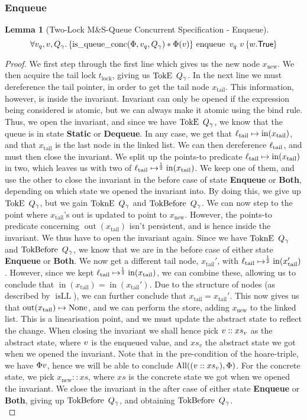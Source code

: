 \documentclass[a4paper, 10pt]{report}
\theoremstyle{definition}
\newtheorem{lemma}[theorem]{Lemma}
\newcommand{\enqueue}{\operatorname{enqueue}}
\newcommand{\msq}{M\&S-Queue\xspace}
\newcommand{\tlmsq}{Two-Lock \msq}
\newcommand{\isqueueconc}{\operatorname{is\_queue\_conc}}
\newcommand{\vq}{v_q}
\newcommand{\xsc}{xs}
\newcommand{\isLL}{\operatorname{isLL}}
\newcommand{\AllP}{\operatorname{All}}
\newcommand{\locN}[1]{\loc_{\mathrm{#1}}}
\newcommand{\loctail}{\locN{tail}}
\newcommand{\nIn}[1]{\operatorname{in}(#1)}
\newcommand{\nOut}[1]{\operatorname{out}(#1)}
\newcommand{\node}{x}
\newcommand{\nodeN}[1]{\node_{\mathrm{#1}}}
\newcommand{\nodetail}{\nodeN{tail}}
\newcommand{\nodenew}{\nodeN{new}}
\newcommand{\absvalue}{\val}
\newcommand{\absvalueList}{xs_v}
\newcommand{\Tlock}{t_{\mathrm{lock}}}
\newcommand{\StaticState}{\textbf{Static}}
\newcommand{\EnqueueState}{\textbf{Enqueue}}
\newcommand{\DequeueState}{\textbf{Dequeue}}
\newcommand{\BothState}{\textbf{Both}}
\newcommand{\Qg}{Q_\gname}
\newcommand{\TokE}[1]{\operatorname{TokE} ~ #1}
\newcommand{\TokEQg}{\TokE{\Qg}}
\newcommand{\ToknE}[1]{\operatorname{ToknE} ~ #1}
\newcommand{\ToknEQg}{\ToknE{\Qg}}
\newcommand{\TokBefore}[1]{\operatorname{TokBefore} ~ #1}
\newcommand{\TokBeforeQg}{\TokBefore{\Qg}}
\newcommand{\TokAfterQg}{\TokBefore{\Qg}}
\newcommand{\tlconcspecenq}{\All \vq, \absvalue, \Qg. \hoare{\isqueueconc(\Phi,\vq,\Qg) \star \Phi(\absvalue)}{\enqueue \ \vq \ \absvalue}{\valB . \TRUE}}
\begin{document}
\subsubsection{Enqueue}
\begin{lemma}[\tlmsq Concurrent Specification - Enqueue]\label{TLMSQ:spec:conc:enqueue}
  \begin{equation*}
    \tlconcspecenq
  \end{equation*}
\end{lemma}
\begin{proof}
We first step through the first line which gives us the new node $\nodenew$. We then acquire the tail lock $\Tlock$, giving us $\TokEQg$. In the next line we must dereference the tail pointer, in order to get the tail node $\nodetail$. This information, however, is inside the invariant. Invariant can only be opened if the expression being considered is atomic, but we can always make it atomic using the bind rule. Thus, we open the invariant, and since we have $\TokEQg$, we know that the queue is in state \StaticState{} or \DequeueState{}. In any case, we get that $\loctail \mapsto \nIn{\nodetail}$, and that $\nodetail$ is the last node in the linked list. We can then dereference $\loctail$, and must then close the invariant. We split up the points-to predicate $\loctail \mapsto \nIn{\nodetail}$ in two, which leaves us with two of $\loctail \mapsto^{\frac{1}{2}} \nIn{\nodetail}$. We keep one of them, and use the other to close the invariant in the before case of state \EnqueueState{} or \BothState{}, depending on which state we opened the invariant into. By doing this, we give up $\TokEQg$, but we gain $\ToknEQg$ and $\TokAfterQg$. We can now step to the point where $\nodetail$'s out is updated to point to $\nodenew$. However, the points-to predicate concerning $\nOut{\nodetail}$ isn't persistent, and is hence inside the invariant. We thus have to open the invariant again. Since we have $\ToknEQg$ and $\TokAfterQg$, we know that we are in the before case of either state \EnqueueState{} or \BothState{}. We now get a different tail node, $\nodetail'$, with $\loctail \mapsto^{\frac{1}{2}} \nIn{\nodetail'}$. However, since we kept $\loctail \mapsto^{\frac{1}{2}} \nIn{\nodetail}$, we can combine these, allowing us to conclude that $\nIn{\nodetail} = \nIn{\nodetail'}$. Due to the structure of nodes (as described by $\isLL$), we can further conclude that $\nodetail = \nodetail'$. This now gives us that $\nOut{\nodetail} \mapsto \None$, and we can perform the store, adding $\nodenew$ to the linked list. This is a linearisation point, and we must update the abstract state to reflect the change. When closing the invariant we shall hence pick $\absvalue :: \absvalueList$ as the abstract state, where $\absvalue$ is the enqueued value, and $\absvalueList$ the abstract state we got when we opened the invariant. Note that in the pre-condition of the hoare-triple, we have $\Phi \absvalue$, hence we will be able to conclude $\AllP((\absvalue :: \absvalueList), \Phi)$. For the concrete state, we pick $\nodenew :: \xsc$, where $\xsc$ is the concrete state we got when we opened the invariant. We close the invariant in the after case of either state \EnqueueState{} or \BothState{}, giving up $\TokAfterQg$, and obtaining $\TokBeforeQg$.\\

\end{proof}
\end{document}
